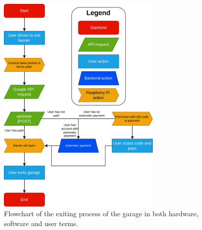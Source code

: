 \begin{figure}[htp]
    \centering
    \includegraphics[width=8cm]{images/flowcharts/garage_exit.drawio.png}
    \caption{Flowchart of the exiting process of the garage in both hardware, software and user terms.}
    \label{fig:garage-exit}
\end{figure}
